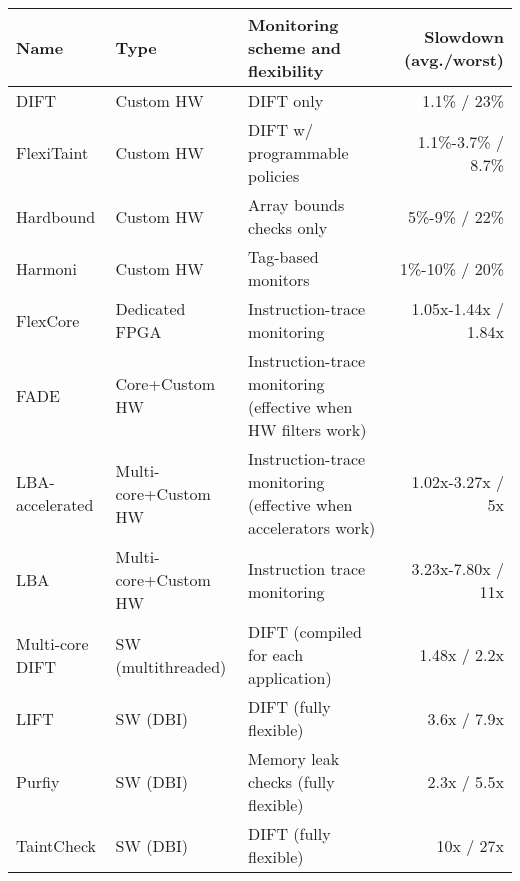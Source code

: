 \begin{tabular}{|l|l|l|r|}

\hline
{\bf Name} & {\bf Type} & {\bf Monitoring scheme and flexibility} & {\bf Slowdown (avg./worst)} \\ \hline\hline

DIFT \cite{dift-asplos04} & Custom HW & DIFT only & 1.1\% / 23\% \\ \hline
FlexiTaint \cite{flexitaint-hpca08} & Custom HW & DIFT w/ programmable policies & 1.1\%-3.7\% / 8.7\% \\ \hline
Hardbound \cite{hardbound-asplos08} & Custom HW & Array bounds checks only & 5\%-9\% / 22\% \\ \hline
Harmoni \cite{harmoni-dsn12} & Custom HW & Tag-based monitors & 1\%-10\% / 20\% \\ \hline\hline

FlexCore \cite{flexcore-micro10} & Dedicated FPGA & Instruction-trace monitoring & 1.05x-1.44x / 1.84x \\ \hline
FADE \cite{FIXME} & Core+Custom HW & Instruction-trace monitoring (effective when HW filters work) & \\ \hline
LBA-accelerated \cite{lba-isca08} & Multi-core+Custom HW & Instruction-trace monitoring (effective when accelerators work) & 1.02x-3.27x / 5x \\ \hline
LBA \cite{lba-asid06} & Multi-core+Custom HW & Instruction trace monitoring & 3.23x-7.80x / 11x \\ \hline \hline

Multi-core DIFT \cite{nagarajan-interact08} & SW (multithreaded) & DIFT (compiled for each application) & 1.48x / 2.2x \\ \hline

LIFT \cite{lift-micro06} & SW (DBI) & DIFT (fully flexible) & 3.6x / 7.9x \\ \hline
Purfiy \cite{purify-usenix92} & SW (DBI) & Memory leak checks (fully flexible) & 2.3x / 5.5x \\ \hline
TaintCheck \cite{taintcheck-05} & SW (DBI) & DIFT (fully flexible) & 10x / 27x \\ \hline


\end{tabular}
